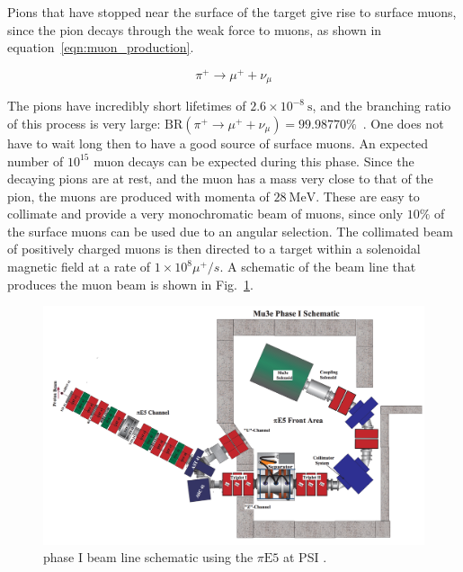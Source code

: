 Pions that have stopped near the surface of the target give rise to surface muons, since the pion decays through the weak force to muons, as shown in equation~\ref{eqn:muon_production}.

\begin{equation}
\label{eqn:muon_production}
\pi^+ \rightarrow \mu^+ + \nu_\mu
\end{equation}

\noindent The pions have incredibly short lifetimes of $2.6 \times 10^{-8}~\textrm{s}$, and the branching ratio of this process is very large: $\textrm{BR}(\pi^+ \rightarrow \mu^+ + \nu_\mu) = 99.98770\%$~\cite{Agashe:2014kda}.
One does not have to wait long then to have a good source of surface muons.
An expected number of $10^{15}$ muon decays can be expected during this phase.
Since the decaying pions are at rest, and the muon has a mass very close to that of the pion, the muons are produced with momenta of $28~\textrm{MeV}$.
These are easy to collimate and provide a very monochromatic beam of muons, since only $10\%$ of the surface muons can be used due to an angular selection.
The collimated beam of positively charged muons is then directed to a target within a solenoidal magnetic field at a rate of $1 \times 10^8 \mu^+/s$.
A schematic of the beam line that produces the muon beam is shown in Fig.~\ref{fig:mu3e_phaseI_schematic}.

\begin{figure}[h]
    \centering
    \includegraphics[width = \textwidth]{Figures/experiments/mu3e_phase1_schematic.png}
    \caption{\mueee phase I beam line schematic using the $\pi\textrm{E5}$ at PSI \cite{Blondel:2013ia}.}
    \label{fig:mu3e_phaseI_schematic}
\end{figure}

